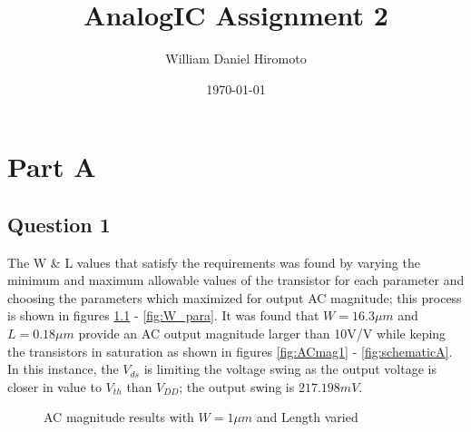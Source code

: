 \documentclass[12pt, letterpaper, notitlepage, DIV=16, BCOR=1mm, headlines=2]{scrreprt}
\title{AnalogIC Assignment 2}
\author{William Daniel Hiromoto}
\date{\today}
\makeatletter
\newcommand*{\tocontents}{\@starttoc{toc}}
\makeatother
\begin{document}
\maketitle

\chapter{Part A}
\section*{Question 1}
The W \& L values that satisfy the requirements was found by varying the minimum and maximum
allowable values of the transistor for each parameter and
choosing the parameters which maximized for output AC magnitude;
this process is shown in figures \ref{fig:L_para} - \ref{fig:W_para}.
It was found that $W = 16.3\mu m$ and $L = 0.18 \mu m$ provide an AC output magnitude
larger than 10V/V while keping the transistors in saturation as shown in figures
\ref{fig:ACmag1} -
\ref{fig:schematicA}.
In this instance, the $V_{ds}$ is limiting the voltage swing as the output voltage
is closer in value to $V_{th}$ than $V_{DD}$; the output swing is $217.198mV$.

\begin{figure}[h]
	\caption{AC magnitude results with $W=1\mu m$ and Length varied}
	\label{fig:L_para}
\end{figure}
\end{document}
